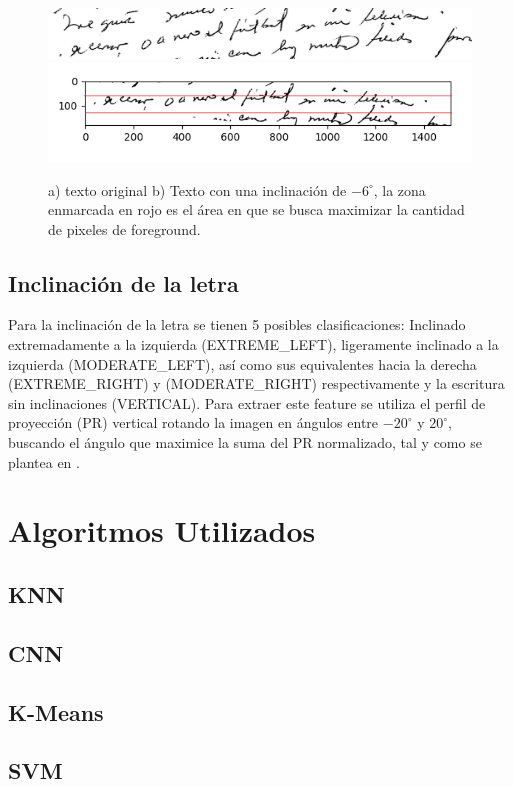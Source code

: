 \documentclass[10pt, a4paper]{article}
\begin{document}
            \begin{figure}[!h]
                \centering
                \includegraphics[width = 0.4\linewidth]{Judith_21.jpg}
                \includegraphics[width = 0.4\linewidth]{Baseline.png}
                \caption{a) texto original b) Texto con una inclinaci\'on de $-6^{\circ}$, la zona enmarcada en rojo es el \'area en que se busca maximizar 
                la cantidad de pixeles de foreground.}
            \end{figure}

        \subsection{Inclinaci\'on de la letra}
            Para la inclinaci\'on de la letra se tienen 5 posibles clasificaciones: Inclinado extremadamente a la izquierda (EXTREME\_LEFT), ligeramente inclinado a la 
            izquierda (MODERATE\_LEFT), as\'i como sus equivalentes hacia la derecha (EXTREME\_RIGHT) y (MODERATE\_RIGHT) respectivamente y la escritura sin inclinaciones (VERTICAL). 
            Para extraer este feature se utiliza el perfil de proyecci\'on (PR) vertical rotando la imagen en \'angulos entre $-20^{\circ}$ y $20^{\circ}$, buscando el \'angulo que maximice
            la suma del PR normalizado, tal y como se plantea en \cite{20}.
\section{Algoritmos Utilizados}
\subsection{KNN}
\subsection{CNN}
\subsection{K-Means}
\subsection{SVM}
\end{document}

